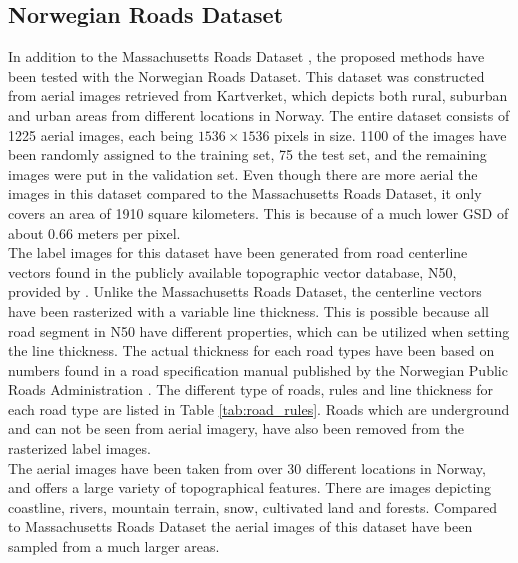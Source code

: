 
\subsection{Norwegian Roads Dataset}
In addition to the Massachusetts Roads Dataset \citep{MnihThesis}, the proposed methods have been tested with the Norwegian Roads Dataset. This dataset was constructed from aerial images retrieved from Kartverket, which depicts both rural, suburban and urban areas from different locations in Norway. The entire dataset consists of 1225 aerial images, each being $1536\times 1536$ pixels in size. 1100 of the images have been randomly assigned to the training set, 75 the test set, and the remaining images were put in the validation set. Even though there are more aerial the images in this dataset compared to the Massachusetts Roads Dataset, it only covers an area of 1910 square kilometers. This is because of a much lower \ac{GSD} of about 0.66 meters per pixel. \\


The label images for this dataset have been generated from road centerline vectors found in the publicly available topographic vector database, N50, provided by \cite{Kartverket}. Unlike the Massachusetts Roads Dataset, the centerline vectors have been rasterized with a variable line thickness. This is possible because all road segment in N50 have different properties, which can be utilized when setting the line thickness. The actual thickness for each road types have been based on numbers found in a road specification manual published by the Norwegian Public Roads Administration \citep{Norwegian_road_manual}. The different type of roads, rules and line thickness for each road type are listed in Table \ref{tab:road_rules}. Roads which are underground and can not be seen from aerial imagery, have also been removed from the rasterized label images. \\

The aerial images have been taken from over 30 different locations in Norway, and offers a large variety of topographical features. There are images depicting coastline, rivers, mountain terrain, snow, cultivated land and forests. Compared to Massachusetts Roads Dataset the aerial images of this dataset have been sampled from a much larger areas. \\

